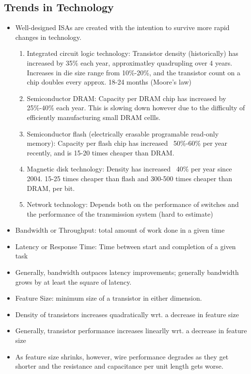 \documentclass[11pt, a4paper]{article}
\theoremstyle{definition}
\theoremstyle{remark}
\begin{document}
\subsection{Trends in Technology}
\begin{itemize}
    \item Well-designed ISAs are created with the intention to survive more rapid changes in technology. 
    \begin{enumerate}
        \item Integrated circuit logic technology: Transistor density (historically) has increased by 35\% each year, approximatley quadrupling over 4 years. Increases in die size range from 10\%-20\%, and the transistor count on a chip doubles every approx. 18-24 months (Moore's law)
        \item Semiconductor DRAM: Capacity per DRAM chip has increased by 25\%-40\% each year. This is slowing down however due to the difficulty of efficiently manufacturing small DRAM cellls.
        \item Semiconductor flash (electrically erasable programable read-only memory): Capacity per flash chip has increased ~50\%-60\% per year recently, and is 15-20 times cheaper than DRAM.
        \item Magnetic disk technology: Density has increased ~40\% per year since 2004. 15-25 times cheaper than flash and 300-500 times cheaper than DRAM, per bit.
        \item Network technology: Depends both on the performance of switches and the performance of the transmission system (hard to estimate)
    \end{enumerate}
    \item Bandwidth or Throughput: total amount of work done in a given time
    \item Latency or Response Time: Time between start and completion of a given task
    \item Generally, bandwidth outpaces latency improvements; generally bandwidth grows by at least the square of latency.
    \item Feature Size: minimum size of a transistor in either dimension. 
    \item Density of transistors increases quadratically wrt. a decrease in feature size
    \item Generally, transistor performance increases linearlly wrt. a decrease in feature size
    \item As feature size shrinks, however, wire performance degrades as they get shorter and the resistance and capacitance per unit length gets worse.
\end{itemize}
\end{document}
